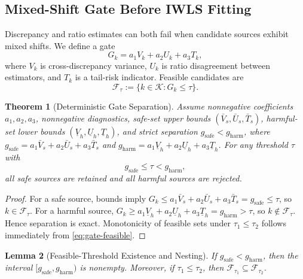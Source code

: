\documentclass{article} %
\newtheorem{theorem}{Theorem}[section]
\newtheorem{lemma}[theorem]{Lemma}
\begin{document}
\subsection{Mixed-Shift Gate Before IWLS Fitting}
Discrepancy and ratio estimates can both fail when candidate sources exhibit mixed shifts. We define a gate
\begin{equation}
G_k=a_1V_k+a_2U_k+a_3T_k,
\label{eq:gate-score}
\end{equation}
where \(V_k\) is cross-discrepancy variance, \(U_k\) is ratio disagreement between estimators, and \(T_k\) is a tail-risk indicator. Feasible candidates are
\begin{equation}
\mathcal{F}_\tau:=\{k\in\mathcal{K}: G_k\le \tau\}.
\label{eq:gate-feasible}
\end{equation}

\begin{theorem}[Deterministic Gate Separation]
\label{thm:gate}
Assume nonnegative coefficients \(a_1,a_2,a_3\), nonnegative diagnostics, safe-set upper bounds \((\bar V_s,\bar U_s,\bar T_s)\), harmful-set lower bounds \((\underline V_h,\underline U_h,\underline T_h)\), and strict separation
\(g_{\mathrm{safe}}<g_{\mathrm{harm}}\), where
\(g_{\mathrm{safe}}=a_1\bar V_s+a_2\bar U_s+a_3\bar T_s\) and
\(g_{\mathrm{harm}}=a_1\underline V_h+a_2\underline U_h+a_3\underline T_h\).
For any threshold \(\tau\) with
\begin{equation}
g_{\mathrm{safe}}\le\tau<g_{\mathrm{harm}},
\label{eq:gate-threshold}
\end{equation}
all safe sources are retained and all harmful sources are rejected.
\end{theorem}

\begin{proof}
For a safe source, bounds imply
\(G_k\le a_1\bar V_s+a_2\bar U_s+a_3\bar T_s=g_{\mathrm{safe}}\le\tau\), so \(k\in\mathcal{F}_\tau\).
For a harmful source,
\(G_k\ge a_1\underline V_h+a_2\underline U_h+a_3\underline T_h=g_{\mathrm{harm}}>\tau\), so \(k\notin\mathcal{F}_\tau\).
Hence separation is exact. Monotonicity of feasible sets under \(\tau_1\le\tau_2\) follows immediately from \eqref{eq:gate-feasible}.
\end{proof}

\begin{lemma}[Feasible-Threshold Existence and Nesting]
\label{lem:gate-feasible}
If \(g_{\mathrm{safe}}<g_{\mathrm{harm}}\), then the interval \([g_{\mathrm{safe}},g_{\mathrm{harm}})\) is nonempty. Moreover, if \(\tau_1\le\tau_2\), then \(\mathcal{F}_{\tau_1}\subseteq\mathcal{F}_{\tau_2}\).
\end{lemma}
\end{document}
